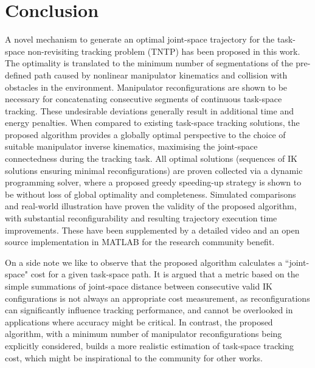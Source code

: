 \documentclass[letterpaper, 10 pt, journal, twoside]{ieeetran}  %
\begin{document}
\section{Conclusion}\label{section:conclusion}
A novel mechanism to generate an optimal joint-space trajectory for the task-space non-revisiting tracking problem (TNTP) has been proposed in this work. 
The optimality is translated to the minimum number of segmentations of the pre-defined path caused by nonlinear manipulator kinematics and collision with obstacles in the environment. 
Manipulator reconfigurations are shown to be necessary for concatenating consecutive segments of continuous task-space tracking. These undesirable deviations generally result in additional time and energy penalties.
When compared to existing task-space tracking solutions, the proposed algorithm provides a globally optimal perspective to the choice of suitable manipulator inverse kinematics, 
maximising the joint-space connectedness during the tracking task. 
All optimal solutions (sequences of IK solutions ensuring minimal reconfigurations) are proven collected via a dynamic programming solver, where a proposed greedy speeding-up strategy is shown to be without loss of global optimality and completeness. 
Simulated comparisons and real-world illustration have proven the validity of the proposed algorithm, with substantial reconfigurability and resulting trajectory execution time improvements. 
These have been supplemented by a detailed video and an open source implementation in MATLAB for the research community benefit. 

On a side note we like to observe that the proposed algorithm calculates a ``joint-space" cost for a given task-space path. 
It is argued that a metric based on the simple summations of joint-space distance between consecutive valid IK configurations is not always an 
appropriate cost measurement, as reconfigurations can significantly influence tracking performance, and cannot be overlooked in applications where accuracy might be critical. 
In contrast, the proposed algorithm, with a minimum number of manipulator reconfigurations being explicitly considered, builds a more realistic estimation of task-space tracking cost, which might be inspirational to the community for other works. 






\newpage
\end{document}
